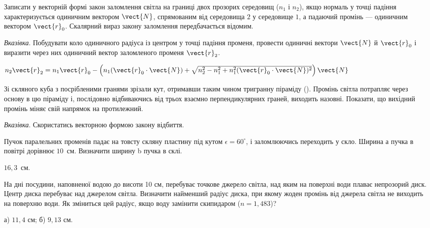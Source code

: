 \begin{problem}
Записати у векторній формі закон заломлення світла на границі двох
прозорих середовищ ($n_1$ і $n_2$), якщо нормаль у точці падіння
характеризується одиничним вектором $\vect{N}$, спрямованим від середовища
$2$ у середовище $1$, а падаючий промінь --- одиничним вектором $\vect{r}_0$.
Скалярний вираз закону заломлення передбачається відомим.

\medskip

\emph{Вказівка}. Побудувати коло одиничного радіуса із центром у точці падіння
променя, провести одиничні вектори $\vect{N}$ й  $\vect{r}_0$ і виразити через них
одиничний вектор заломленого променя $\vect{r}_2$.
\begin{solution}
	$n_2\vect{r}_2 = n_1\vect{r}_0 - \left( n_1 (\vect{r}_0 \cdot \vect{N}) + \sqrt{n_2^2 - n_1^2 + n_1^2 (\vect{r}_0 \cdot \vect{N})^2} \right)\vect{N} $
\end{solution}
\end{problem}

\begin{problem}
Зі скляного куба з посрібленими гранями зрізали кут, отримавши
таким чином тригранну піраміду (). Промінь світла потрапляє через
основу в цю піраміду і, послідовно відбиваючись від трьох взаємно
перпендикулярних граней, виходить назовні. Показати, що вихідний
промінь міняє свій напрямок на протилежний.

\medskip

\emph{Вказівка}. Скористатись векторною формою закону відбиття.
\end{problem}

\begin{problem}
Пучок паралельних променів падає на товсту скляну пластину під
кутом $\epsilon = 60^\circ$, і заломлюючись переходить у скло. Ширина а пучка в
повітрі дорівнює $10$~см. Визначити ширину b пучка в склі.
\begin{solution}
	$16,3$~см.
\end{solution}
\end{problem}

\begin{problem}
На дні посудини, наповненої водою до висоти 10 см, перебуває
точкове джерело світла, над яким на поверхні води плаває непрозорий
диск. Центр диска перебуває над джерелом світла. Визначити
найменший радіус диска, при якому жоден промінь від джерела світла
не виходить на поверхню води. Як зміниться цей радіус, якщо воду
замінити скипидаром ($n = 1,483$)?
\begin{solution}
	а) $11,4$ см; б) $9,13$ см.
\end{solution}
\end{problem}

